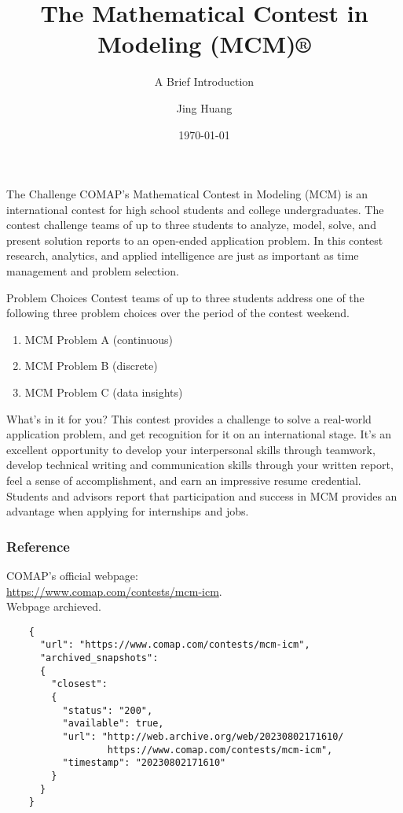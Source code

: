 \documentclass{beamer}
\begin{document}
\title{The Mathematical Contest in Modeling (MCM)®}
\subtitle{A Brief Introduction}
\author{Jing Huang}
\date{\today}
\maketitle

\begin{frame}{The Challenge}
  COMAP's Mathematical Contest in Modeling (MCM) is an international contest for high school students and college undergraduates.
  The contest challenge teams of up to three students to analyze, model, solve, and present solution reports to an open-ended application problem.
  In this contest research, analytics, and applied intelligence are just as important as time management and problem selection.
\end{frame}

\begin{frame}{Problem Choices}
  Contest teams of up to three students address one of the following three problem choices over the period of the contest weekend.
  \begin{enumerate}
    \item MCM Problem A (continuous)
    \item MCM Problem B (discrete)
    \item MCM Problem C (data insights)
  \end{enumerate}
\end{frame}

\begin{frame}{What's in it for you?}
  This contest provides a challenge to solve a real-world application problem, and get recognition for it on an international stage.
  It's an excellent opportunity to develop your interpersonal skills through teamwork, develop technical writing and communication skills through your written report,
  feel a sense of accomplishment, and earn an impressive resume credential.
  Students and advisors report that participation and success in MCM provides an advantage when applying for internships and jobs.
\end{frame}

\begin{frame}[fragile]\frametitle{Reference}
  \begin{list}{[\theref]}{}
    \item COMAP's official webpage:\\\url{https://www.comap.com/contests/mcm-icm}.\\Webpage archieved.
  \end{list}
  \scriptsize
  \begin{verbatim}
    {
      "url": "https://www.comap.com/contests/mcm-icm",
      "archived_snapshots":
      {
        "closest":
        {
          "status": "200",
          "available": true,
          "url": "http://web.archive.org/web/20230802171610/
                  https://www.comap.com/contests/mcm-icm",
          "timestamp": "20230802171610"
        }
      }
    }
  \end{verbatim}
\end{frame}
\end{document}
